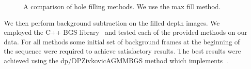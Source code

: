 \documentclass[11pt]{article} %
\begin{document}
\begin{figure}
\centering
{}%
\qquad
{}%
\qquad
{}%
\caption{A comparison of hole filling methods. We use the max fill method. }
\label{fig:filtering}
\end{figure}



We then perform background subtraction on the filled depth images. We employed the C++ BGS library~\cite{bgslibrary} and tested each of the provided methods on our data. For all methods some initial set of background frames at the beginning of the sequence were required to achieve satisfactory results. The best results were achieved using the dp/DPZivkovicAGMMBGS method which implements~\cite{Zivkovic2004}. 
\end{document}
